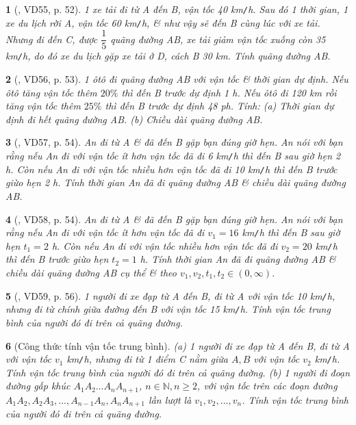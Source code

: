 \documentclass{article}
\newtheorem{baitoan}{}
\begin{document}
\begin{baitoan}[\cite{Binh_Toan_6_tap_2}, VD55, p. 52]
	1 xe tải đi từ A đến B, vận tốc {\rm40 km{\tt/}h}. Sau đó 1 thời gian, 1 xe du lịch rời A, vận tốc {\rm60 km{\tt/}h}, \& như vậy sẽ đến B cùng lúc với xe tải. Nhưng đi đến C, được $\dfrac{1}{5}$ quãng đường AB, xe tải giảm vận tốc xuống còn {\rm35 km{\tt/}h}, do đó xe du lịch gặp xe tải ở D, cách B {\rm30 km}. Tính quãng đường AB.
\end{baitoan}

\begin{baitoan}[\cite{Binh_Toan_6_tap_2}, VD56, p. 53]
	1 ôtô đi quãng đường AB với vận tốc \& thời gian dự định. Nếu ôtô tăng vận tốc thêm $20\%$ thì đến B trước dự định {\rm1 h}. Nếu ôtô đi {\rm120 km} rồi tăng vận tốc thêm $25\%$ thì đến B trước dự định {\rm48 ph}. Tính: (a) Thời gian dự định đi hết quãng đường AB. (b) Chiều dài quãng đường AB.
\end{baitoan}

\begin{baitoan}[\cite{Binh_Toan_6_tap_2}, VD57, p. 54]
	An đi từ A \& đã đến B gặp bạn đúng giờ hẹn. An nói với bạn rằng nếu An đi với vận tốc ít hơn vận tốc đã đi {\rm6 km{\tt/}h} thì đến B sau giờ hẹn {\rm2 h}. Còn nếu An đi với vận tốc nhiều hơn vận tốc đã đi {\rm10 km{\tt/}h} thì đến B trước giừo hẹn {\rm2 h}. Tính thời gian An đã đi quãng đường AB \& chiều dài quãng đường AB.
\end{baitoan}

\begin{baitoan}[\cite{Binh_Toan_6_tap_2}, VD58, p. 54]
	An đi từ A \& đã đến B gặp bạn đúng giờ hẹn. An nói với bạn rằng nếu An đi với vận tốc ít hơn vận tốc đã đi $v_1 = 16$ {\rm km{\tt/}h} thì đến B sau giờ hẹn $t_1 = 2$ {\rm h}. Còn nếu An đi với vận tốc nhiều hơn vận tốc đã đi $v_2 = 20$ {\rm km{\tt/}h} thì đến B trước giừo hẹn $t_2 = 1$ {\rm h}. Tính thời gian An đã đi quãng đường AB \& chiều dài quãng đường AB cụ thể \& theo $v_1,v_2,t_1,t_2\in(0,\infty)$.
\end{baitoan}

\begin{baitoan}[\cite{Binh_Toan_6_tap_2}, VD59, p. 56]
	1 người đi xe đạp từ A đến B, đi từ A với vận tốc {\rm10 km{\tt/}h}, nhưng đi từ chính giữa đường đến B với vận tốc {\rm15 km{\tt/}h}. Tính vận tốc trung bình của người đó đi trên cả quãng đường.
\end{baitoan}

\begin{baitoan}[Công thức tính vận tốc trung bình]
	(a) 1 người đi xe đạp từ A đến B, đi từ A với vận tốc $v_1$ {\rm km{\tt/}h}, nhưng đi từ 1 điểm C nằm giữa $A,B$ với vận tốc $v_2$ {\rm km{\tt/}h}. Tính vận tốc trung bình của người đó đi trên cả quãng đường. (b) 1 người đi đoạn đường gấp khúc $A_1A_2\ldots A_nA_{n+1}$, $n\in\mathbb{N},n\ge2$, với vận tốc trên các đoạn đường $A_1A_2,A_2A_3,\ldots,A_{n-1}A_n,A_nA_{n+1}$ lần lượt là $v_1,v_2,\ldots,v_n$. Tính vận tốc trung bình của người đó đi trên cả quãng đường.
\end{baitoan}
\end{document}
